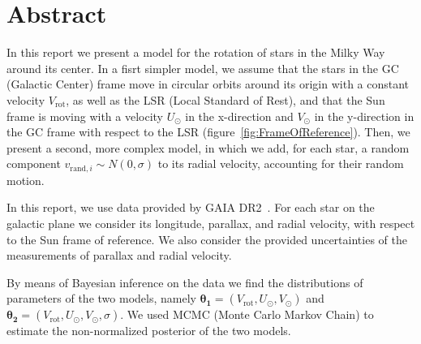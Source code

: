 \section*{Abstract}

In this report we present a model for the rotation of stars in the Milky Way around its center.
In a fisrt simpler model, we assume that the stars in the GC (Galactic Center) frame move in circular orbits around its origin with a constant velocity $V_{\text{rot}}$, as well as the LSR (Local Standard of Rest), and that the Sun frame is moving with a velocity $U_{\odot}$ in the x-direction and $V_{\odot}$ in the y-direction in the GC frame with respect to the LSR (figure~\ref{fig:FrameOfReference}). Then, we present a second, more complex model, in which we add, for each star, a random component $v_{\text{rand}, i} \sim N(0, \sigma)$ to its radial velocity, accounting for their random motion.



In this report, we use data provided by GAIA DR2~\cite{GAIADR2}.
For each star on the galactic plane we consider its longitude, parallax, and radial velocity, with respect to the Sun frame of reference.
We also consider the provided uncertainties of the measurements of parallax and radial velocity.

By means of Bayesian inference on the data we find the distributions of parameters of the two models, namely $\mathbf{\theta_1} = (V_{\text{rot}}, U_{\odot}, V_{\odot})$ and $\mathbf{\theta_2} = (V_{\text{rot}}, U_{\odot}, V_{\odot}, \sigma)$.
We used MCMC (Monte Carlo Markov Chain) to estimate the non-normalized posterior of the two models. 


